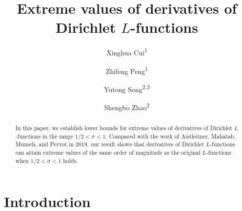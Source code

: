\documentclass[12pt,reqno]{amsart}
\theoremstyle{definition}
\numberwithin{equation}{section}
\begin{document}
    
\title[Extreme values of derivatives of Dirichlet $L$-functions]{Extreme values of derivatives of Dirichlet $L$-functions}

\author{Xinghua Cui\textsuperscript{1}}
\author{Zhifeng Peng\textsuperscript{1}}
\author{Yutong Song\textsuperscript{2,3}}
\author{Shengbo Zhao\textsuperscript{2}}

\address{1. School of Mathematical Sciences, Soochow University, Suzhou 215006, China}
\address{2. School of Mathematical Sciences, Key Laboratory of Intelligent Computing and Applications (Tongji University), Ministry of Education, Tongji University, Shanghai 200092, China}	
\address{3. Institute of Analysis and Number Theory, Graz University of Technology, Steyrergasse 30, 8010 Graz, Austria}



	
	\begin{abstract} 
    In this paper, we establish lower bounds for extreme values of derivatives of Dirichlet \(L\)-functions in the range \(1/2<\sigma<1\). Compared with the work of Aistleitner, Mahatab, Munsch, and Peyrot in 2019, our result shows that derivatives of Dirichlet \(L\)-functions can attain extreme values of the same order of magnitude as the original \(L\)-functions when \(1/2<\sigma<1\) holds.
	\end{abstract}
	
	
	
	\maketitle

\section{Introduction}
\end{document}
